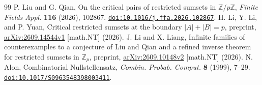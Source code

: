 \documentclass[10pt,a4paper]{amsart}
\begin{document}
\begin{thebibliography}{99}
P. Liu and G. Qian, On the critical pairs of restricted sumsets in
$\mathbb Z/p\mathbb Z$, \emph{Finite Fields Appl.} \textbf{116} (2026), 102867.
\href{https://doi.org/10.1016/j.ffa.2026.102867}{\nolinkurl{doi:10.1016/j.ffa.2026.102867}}.
H. Li, Y. Li, and P. Yuan, Critical restricted sumsets at the boundary
$|A|+|B|=p$, preprint, \href{https://arxiv.org/abs/2609.14544v1}{arXiv:2609.14544v1} [math.NT] (2026).
J. Li and X. Liang, Infinite families of counterexamples to a conjecture
of Liu and Qian and a refined inverse theorem for restricted sumsets in
$\mathbb Z_p$, preprint, \href{https://arxiv.org/abs/2609.10148v2}{arXiv:2609.10148v2} [math.NT] (2026).
N. Alon, Combinatorial Nullstellensatz,
\emph{Combin. Probab. Comput.} \textbf{8} (1999), 7--29.
\href{https://doi.org/10.1017/S0963548398003411}{\nolinkurl{doi:10.1017/S0963548398003411}}.
\end{thebibliography}
\end{document}
